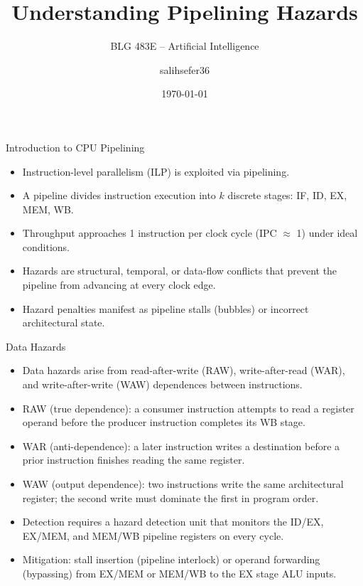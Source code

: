\documentclass{beamer}
\title{Understanding Pipelining Hazards}
\subtitle{BLG 483E -- Artificial Intelligence}
\author{salihsefer36}
\date{\today}
\begin{document}
\begin{frame}
  \titlepage
\end{frame}

\begin{frame}{Introduction to CPU Pipelining}
  \begin{itemize}
    \item Instruction-level parallelism (ILP) is exploited via pipelining.
    \item A pipeline divides instruction execution into $k$ discrete stages:
          IF, ID, EX, MEM, WB.
    \item Throughput approaches 1 instruction per clock cycle (IPC $\approx$ 1)
          under ideal conditions.
    \item Hazards are structural, temporal, or data-flow conflicts that prevent
          the pipeline from advancing at every clock edge.
    \item Hazard penalties manifest as pipeline stalls (bubbles) or incorrect
          architectural state.
  \end{itemize}
\end{frame}

\begin{frame}{Data Hazards}
  \begin{itemize}
    \item Data hazards arise from read-after-write (RAW), write-after-read (WAR),
          and write-after-write (WAW) dependences between instructions.
    \item RAW (true dependence): a consumer instruction attempts to read a
          register operand before the producer instruction completes its WB stage.
    \item WAR (anti-dependence): a later instruction writes a destination before
          a prior instruction finishes reading the same register.
    \item WAW (output dependence): two instructions write the same architectural
          register; the second write must dominate the first in program order.
    \item Detection requires a hazard detection unit that monitors the ID/EX,
          EX/MEM, and MEM/WB pipeline registers on every cycle.
    \item Mitigation: stall insertion (pipeline interlock) or operand forwarding
          (bypassing) from EX/MEM or MEM/WB to the EX stage ALU inputs.
  \end{itemize}
\end{frame}
\end{document}
